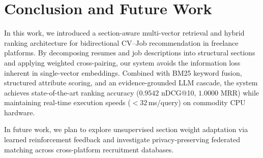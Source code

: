 \documentclass[runningheads]{llncs}
\begin{document}
\section{Conclusion and Future Work}

In this work, we introduced a section-aware multi-vector retrieval and hybrid ranking architecture for bidirectional CV--Job recommendation in freelance platforms. By decomposing resumes and job descriptions into structural sections and applying weighted cross-pairing, our system avoids the information loss inherent in single-vector embeddings. Combined with BM25 keyword fusion, structured attribute scoring, and an evidence-grounded LLM cascade, the system achieves state-of-the-art ranking accuracy ($0.9542$ nDCG@10, $1.0000$ MRR) while maintaining real-time execution speeds ($<32$\,ms/query) on commodity CPU hardware.

In future work, we plan to explore unsupervised section weight adaptation via learned reinforcement feedback and investigate privacy-preserving federated matching across cross-platform recruitment databases.
\end{document}
